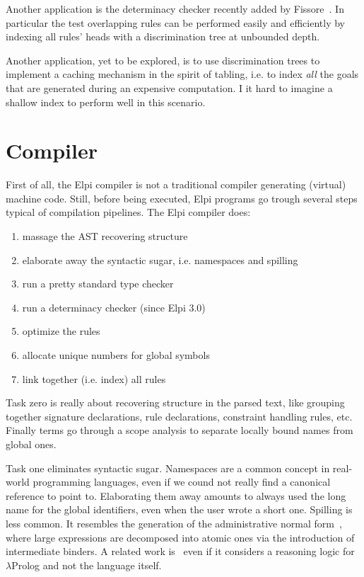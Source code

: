 \documentclass[a4paper, 11pt]{book}
\begin{document}
Another application is the determinacy checker recently added by
Fissore~\cite{elpidet}. In particular the test overlapping rules
can be performed easily and efficiently by indexing all rules' heads with
a discrimination tree at unbounded depth.

Another application, yet to be explored, is to use discrimination trees
to implement a caching mechanism in the spirit of tabling, i.e. to index
\emph{all} the goals that are generated during an expensive computation.
I it hard to imagine a shallow index to perform well in this scenario.

\section{Compiler}

First of all, the Elpi compiler is not a traditional compiler generating (virtual)
machine code. Still, before being executed, Elpi programs go trough several
steps typical of compilation pipelines. The Elpi compiler does:

\begin{enumerate}
  \setcounter{enumi}{0}
  \item massage the AST recovering structure
  \item elaborate away the syntactic sugar, i.e. namespaces and spilling
  \item run a pretty standard type checker
  \item run a determinacy checker (since Elpi 3.0)
  \item optimize the rules
  \item allocate unique numbers for global symbols
  \item link together (i.e. index) all rules
\end{enumerate}

\noindent
Task zero is really about recovering structure in the parsed text, like
grouping together signature declarations, rule declarations, constraint
handling rules, etc. Finally terms go through a scope analysis to separate
locally bound names from global ones.

Task one eliminates syntactic sugar. Namespaces are a common concept in
real-world programming languages, even if we cound not really find a
canonical reference to point to. Elaborating them away amounts to always
used the long name for the global identifiers, even when the user wrote
a short one. Spilling is less common. It resembles the generation of
the administrative normal form~\cite{10.1145/141478.141563}, where large
expressions are decomposed into atomic ones via the introduction of
intermediate binders. A related work is~\cite{chaudhuri:hal-01806154}
even if it considers a reasoning logic for $\lambda$Prolog and not the
language itself.
\end{document}
